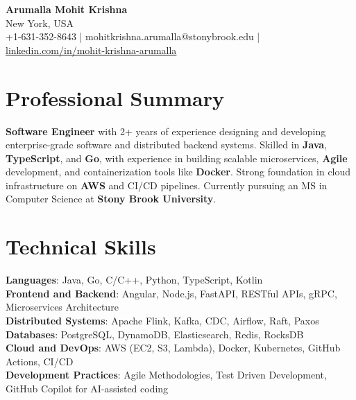 \documentclass[letterpaper,11pt]{article}
\begin{document}
\begin{center}
  {\Large \textbf{Arumalla Mohit Krishna}} \\
  New York, USA \\
  +1-631-352-8643 \enspace | \enspace mohitkrishna.arumalla@stonybrook.edu \enspace | \enspace \href{https://www.linkedin.com/in/mohit-krishna-arumalla}{linkedin.com/in/mohit-krishna-arumalla}
\end{center}

\section{Professional Summary}
  \begin{itemize}[leftmargin=0.15in, label={}]
    \small{\item{
     \textbf{Software Engineer} with 2+ years of experience designing and developing enterprise-grade software and distributed backend systems. Skilled in \textbf{Java}, \textbf{TypeScript}, and \textbf{Go}, with experience in building scalable microservices, \textbf{Agile} development, and containerization tools like \textbf{Docker}. Strong foundation in cloud infrastructure on \textbf{AWS} and CI/CD pipelines. Currently pursuing an MS in Computer Science at \textbf{Stony Brook University}.
    }}
  \end{itemize}
\vspace{-16pt}

\section{Technical Skills}
 \begin{itemize}[leftmargin=0.15in, label={}]
    \small{\item{
     \textbf{Languages}: Java, Go, C/C++, Python, TypeScript, Kotlin \\
     \textbf{Frontend and Backend}: Angular, Node.js, FastAPI, RESTful APIs, gRPC, Microservices Architecture \\
     \textbf{Distributed Systems}: Apache Flink, Kafka, CDC, Airflow, Raft, Paxos \\
     \textbf{Databases}: PostgreSQL, DynamoDB, Elasticsearch, Redis, RocksDB \\
     \textbf{Cloud and DevOps}: AWS (EC2, S3, Lambda), Docker, Kubernetes, GitHub Actions, CI/CD \\
     \textbf{Development Practices}: Agile Methodologies, Test Driven Development, GitHub Copilot for AI-assisted coding
    }}
 \end{itemize}
\vspace{-16pt}
\end{document}
